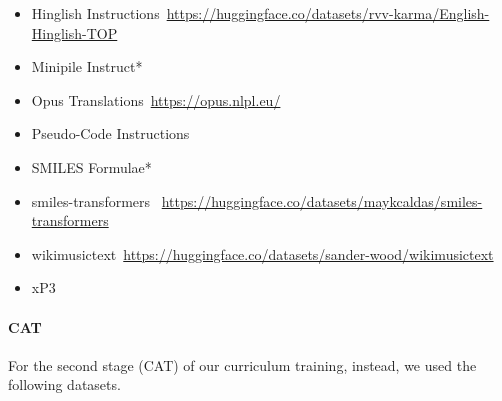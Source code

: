 \begin{itemize}
\begin{itemize}
    \item Hinglish Instructions~{\tiny\url{https://huggingface.co/datasets/rvv-karma/English-Hinglish-TOP}}
    \item Minipile Instruct*
    \item Opus Translations~{\tiny\url{https://opus.nlpl.eu/}}
    \item Pseudo-Code Instructions~\citep{mishra2023prompting}
    \item SMILES Formulae*
    \item smiles-transformers~{
    \tiny\url{https://huggingface.co/datasets/maykcaldas/smiles-transformers}
    }
    \item wikimusictext~{\tiny\url{https://huggingface.co/datasets/sander-wood/wikimusictext}}
    \item xP3~\citep{muennighoff2022crosslingual}
    \end{itemize}
\end{itemize}


\paragraph{CAT}
For the second stage (CAT) of our curriculum training, instead, we used the following datasets.

